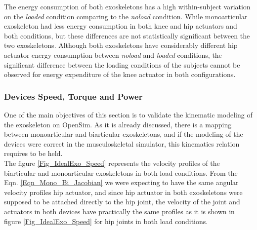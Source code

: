 \documentclass[10pt,letterpaper]{article}
\begin{document}
The energy consumption of both exoskeletons has a high within-subject variation on the \textit{loaded} condition comparing to the \textit{noload} condition. While monoarticular exoskeleton had less energy consumption in both knee and hip actuators and both conditions, but these differences are not statistically significant between the two exoskeletons.  Although both exoskeletons have considerably different hip actuator energy consumption between \textit{noload} and \textit{loaded} conditions, the significant difference between the loading conditions of the subjects cannot be observed for energy expenditure of the knee actuator in both configurations.\\
\subsubsection*{Devices Speed, Torque and Power}
One of the main objectives of this section is to validate the kinematic modeling of the exoskeleton on OpenSim. As it is already discussed, there is a mapping between monoarticular and biarticular exoskeletons, and if the modeling of the devices were correct in the musculoskeletal simulator, this kinematics relation requires to be held.\\
The figure \ref{Fig_IdealExo_Speed} represents the velocity profiles of the biarticular and monoarticular exoskeletons in both load conditions. From the Eqn. \ref{Eqn_Mono_Bi_Jacobian} we were expecting to have the same angular velocity profiles hip actuator, and since hip actuator in both exoskeletons were supposed to be attached directly to the hip joint, the velocity of the joint and actuators in both devices have practically the same profiles as it is shown in figure \ref{Fig_IdealExo_Speed}  for hip joints in both load conditions.\\
\end{document}
